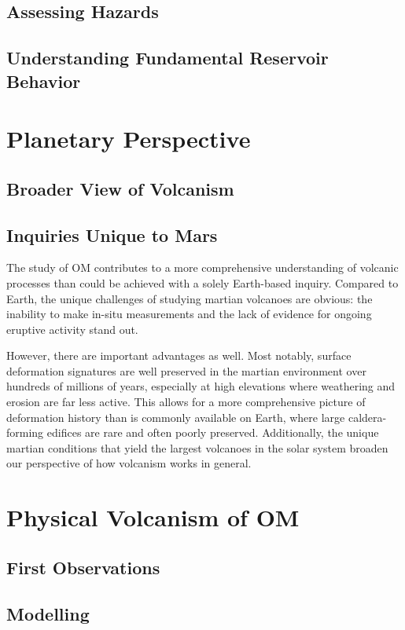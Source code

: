 \subsection{Assessing Hazards}
\subsection{Understanding Fundamental Reservoir Behavior}

\section{Planetary Perspective}

\subsection{Broader View of Volcanism}
\subsection{Inquiries Unique to Mars}
The study of \ac{OM} contributes to a more comprehensive understanding of volcanic processes than could be achieved with a solely Earth-based inquiry. Compared to Earth, the unique challenges of studying martian volcanoes are obvious: the inability to make in-situ measurements and the lack of evidence for ongoing eruptive activity stand out. 

However, there are important advantages as well. Most notably, surface deformation signatures are well preserved in the martian environment over hundreds of millions of years, especially at high elevations where weathering and erosion are far less active. This allows for a more comprehensive picture of deformation history than is commonly available on Earth, where large caldera-forming edifices are rare and often poorly preserved. Additionally, the unique martian conditions that yield the largest volcanoes in the solar system broaden our perspective of how volcanism works in general.

\section{Physical Volcanism of \acl{OM}}
\subsection{First Observations}
\subsection{Modelling}
